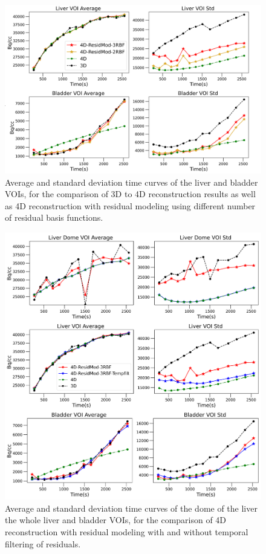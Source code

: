 \begin{figure} [h!]
\centering
\includegraphics[scale=0.44,angle=0]{3_Results/3_3_DWB_Reconstruction/MIC2020/TACs.png}
\caption{Average and standard deviation time curves of the liver and bladder VOIs, for the comparison of 3D to 4D reconstruction results as well as 4D reconstruction with residual modeling using different number of residual basis functions.} 
\label{fig:TACs}
\end{figure}

\begin{figure} [h!]
\centering
\includegraphics[scale=0.58 ,angle=0]{3_Results/3_3_DWB_Reconstruction/MIC2020/TACsFilt.png}
\caption{Average and standard deviation time curves of the dome of the liver the whole liver and bladder VOIs, for the comparison of 4D reconstruction with residual modeling with and without temporal filtering of residuals.} 
\label{fig:TACsFilt}
\end{figure}


